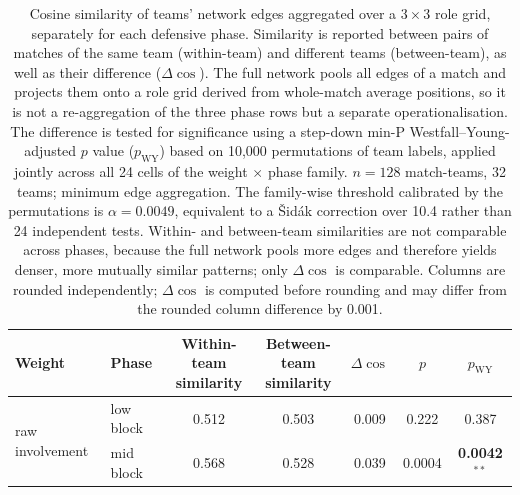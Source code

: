 \begin{table}[H]
\centering
\caption{Cosine similarity of teams' network edges aggregated over a $3\times3$ role
grid, separately for each defensive phase. Similarity is reported between pairs of
matches of the same team (within-team) and different teams (between-team), as well as
their difference ($\Delta\cos$). The full network pools all edges of a match and
projects them onto a role grid derived from whole-match average positions, so it is
not a re-aggregation of the three phase rows but a separate operationalisation. The
difference is tested for significance using a step-down min-P Westfall--Young-adjusted
$p$ value ($p_{\mathrm{WY}}$) based on 10{,}000 permutations of team labels, applied
jointly across all 24 cells of the weight $\times$ phase family. $n=128$ match-teams,
32 teams; minimum edge aggregation. The family-wise threshold calibrated by the
permutations is $\alpha=0.0049$, equivalent to a \v{S}id\'ak correction over 10.4
rather than 24 independent tests. Within- and between-team similarities are not
comparable across phases, because the full network pools more edges and therefore
yields denser, more mutually similar patterns; only $\Delta\cos$ is comparable.
Columns are rounded independently; $\Delta\cos$ is computed before rounding and may
differ from the rounded column difference by 0.001.}
\label{tab:zonal_identity}
\begin{tabular}{llccccc}
\toprule
Weight & Phase & \makecell{Within-team\\similarity} & \makecell{Between-team\\similarity} & $\Delta\cos$ & $p$ &
$p_{\mathrm{WY}}$ \\
\midrule
\multirow{4}{*}{raw involvement}
 & low block    & 0.512 & 0.503 & 0.009 & 0.222 & 0.387 \\
 & mid block    & 0.568 & 0.528 & 0.039 & 0.0004 & \textbf{0.0042}$^{**}$ \\

\end{tabular}
\end{table}

